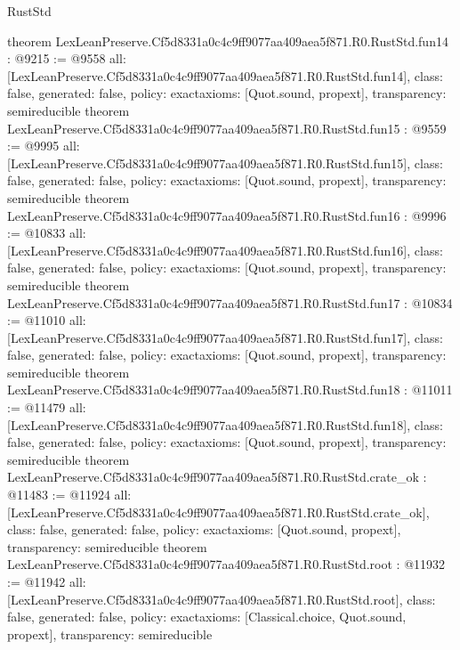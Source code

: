 \begin{lexlean}{RustStd}
\begin{coremodule}
{}
theorem LexLeanPreserve.Cf5d8331a0c4c9ff9077aa409aea5f871.R0.RustStd.fun14 : @9215 := @9558 {
  all: [LexLeanPreserve.Cf5d8331a0c4c9ff9077aa409aea5f871.R0.RustStd.fun14],
  class: false,
  generated: false,
  policy: exact{axioms: [Quot.sound, propext]},
  transparency: semireducible
}
theorem LexLeanPreserve.Cf5d8331a0c4c9ff9077aa409aea5f871.R0.RustStd.fun15 : @9559 := @9995 {
  all: [LexLeanPreserve.Cf5d8331a0c4c9ff9077aa409aea5f871.R0.RustStd.fun15],
  class: false,
  generated: false,
  policy: exact{axioms: [Quot.sound, propext]},
  transparency: semireducible
}
theorem LexLeanPreserve.Cf5d8331a0c4c9ff9077aa409aea5f871.R0.RustStd.fun16 : @9996 := @10833 {
  all: [LexLeanPreserve.Cf5d8331a0c4c9ff9077aa409aea5f871.R0.RustStd.fun16],
  class: false,
  generated: false,
  policy: exact{axioms: [Quot.sound, propext]},
  transparency: semireducible
}
theorem LexLeanPreserve.Cf5d8331a0c4c9ff9077aa409aea5f871.R0.RustStd.fun17 : @10834 := @11010 {
  all: [LexLeanPreserve.Cf5d8331a0c4c9ff9077aa409aea5f871.R0.RustStd.fun17],
  class: false,
  generated: false,
  policy: exact{axioms: [Quot.sound, propext]},
  transparency: semireducible
}
theorem LexLeanPreserve.Cf5d8331a0c4c9ff9077aa409aea5f871.R0.RustStd.fun18 : @11011 := @11479 {
  all: [LexLeanPreserve.Cf5d8331a0c4c9ff9077aa409aea5f871.R0.RustStd.fun18],
  class: false,
  generated: false,
  policy: exact{axioms: [Quot.sound, propext]},
  transparency: semireducible
}
theorem LexLeanPreserve.Cf5d8331a0c4c9ff9077aa409aea5f871.R0.RustStd.crate_ok : @11483 := @11924 {
  all: [LexLeanPreserve.Cf5d8331a0c4c9ff9077aa409aea5f871.R0.RustStd.crate_ok],
  class: false,
  generated: false,
  policy: exact{axioms: [Quot.sound, propext]},
  transparency: semireducible
}
theorem LexLeanPreserve.Cf5d8331a0c4c9ff9077aa409aea5f871.R0.RustStd.root : @11932 := @11942 {
  all: [LexLeanPreserve.Cf5d8331a0c4c9ff9077aa409aea5f871.R0.RustStd.root],
  class: false,
  generated: false,
  policy: exact{axioms: [Classical.choice, Quot.sound, propext]},
  transparency: semireducible
}


\end{coremodule}
\end{lexlean}
